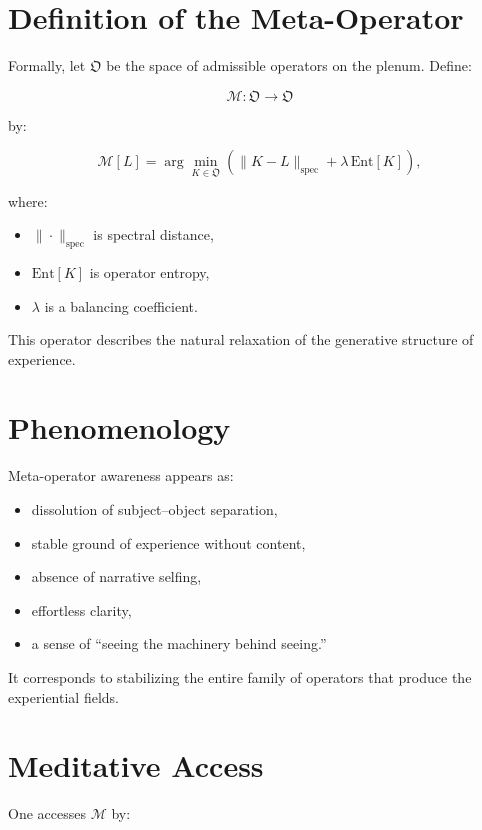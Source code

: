 \documentclass[12pt]{article}
\begin{document}
\section{Definition of the Meta-Operator}

Formally, let $\mathfrak{O}$ be the space of admissible operators on the plenum.
Define:

\[
\mathcal{M} : \mathfrak{O} \to \mathfrak{O}
\]

by:

\[
\mathcal{M}[L]
    = \arg\min_{K \in \mathfrak{O}}
      \left(
        \|K - L\|_{\mathrm{spec}}
        + \lambda \,\mathrm{Ent}[K]
      \right),
\]

where:

\begin{itemize}
    \item $\|\cdot\|_{\mathrm{spec}}$ is spectral distance,
    \item $\mathrm{Ent}[K]$ is operator entropy,
    \item $\lambda$ is a balancing coefficient.
\end{itemize}

This operator describes the natural relaxation of the generative structure of experience.

\section{Phenomenology}

Meta-operator awareness appears as:

\begin{itemize}
    \item dissolution of subject–object separation,
    \item stable ground of experience without content,
    \item absence of narrative selfing,
    \item effortless clarity,
    \item a sense of ``seeing the machinery behind seeing.''
\end{itemize}

It corresponds to stabilizing the entire family of operators that produce the experiential fields.

\section{Meditative Access}

One accesses $\mathcal{M}$ by:
\end{document}
